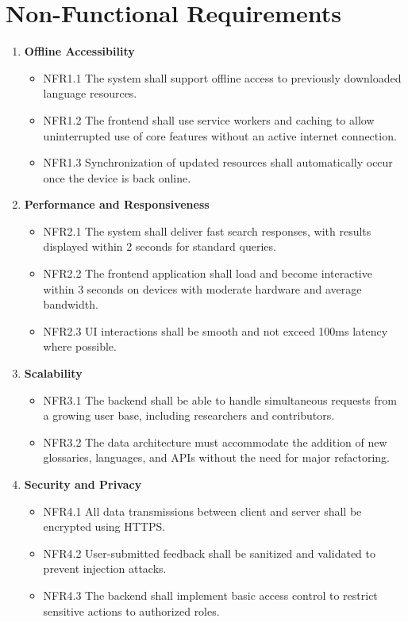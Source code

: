 \documentclass[12pt]{article}
\begin{document}
\section{Non-Functional Requirements}

\begin{enumerate}[label=NFR\arabic*:, leftmargin=2.5em]
    \item \textbf{Offline Accessibility}
    \begin{itemize}
        \item NFR1.1 The system shall support offline access to previously downloaded language resources.
        \item NFR1.2 The frontend shall use service workers and caching to allow uninterrupted use of core features without an active internet connection.
        \item NFR1.3 Synchronization of updated resources shall automatically occur once the device is back online.
    \end{itemize}
    
    \item \textbf{Performance and Responsiveness}
    \begin{itemize}
        \item NFR2.1 The system shall deliver fast search responses, with results displayed within 2 seconds for standard queries.
        \item NFR2.2 The frontend application shall load and become interactive within 3 seconds on devices with moderate hardware and average bandwidth.
        \item NFR2.3 UI interactions shall be smooth and not exceed 100ms latency where possible.
    \end{itemize}
    
    \item \textbf{Scalability}
    \begin{itemize}
        \item NFR3.1 The backend shall be able to handle simultaneous requests from a growing user base, including researchers and contributors.
        \item NFR3.2 The data architecture must accommodate the addition of new glossaries, languages, and APIs without the need for major refactoring.
    \end{itemize}
    
    \item \textbf{Security and Privacy}
    \begin{itemize}
        \item NFR4.1 All data transmissions between client and server shall be encrypted using HTTPS.
        \item NFR4.2 User-submitted feedback shall be sanitized and validated to prevent injection attacks.
        \item NFR4.3 The backend shall implement basic access control to restrict sensitive actions to authorized roles.
    \end{itemize}
    

\end{enumerate}
\end{document}

